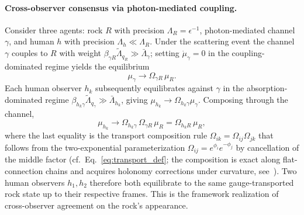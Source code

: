 \documentclass[11pt]{article}
\begin{document}
\paragraph{Cross-observer consensus via photon-mediated coupling.} Consider three agents: rock $R$ with precision $\Lambda_R = \epsilon^{-1}$, photon-mediated channel $\gamma$, and human $h$ with precision $\Lambda_h \ll \Lambda_R$. Under the scattering event the channel $\gamma$ couples to $R$ with weight $\beta_{\gamma R}\tilde{\Lambda}_{q_R} \gg \bar{\Lambda}_\gamma$; setting $\dot{\mu}_\gamma = 0$ in the coupling-dominated regime yields the equilibrium
\begin{equation}
\mu_\gamma \to \Omega_{\gamma R}\,\mu_R.
\end{equation}
Each human observer $h_k$ subsequently equilibrates against $\gamma$ in the absorption-dominated regime $\beta_{h_k\gamma}\tilde{\Lambda}_{q_\gamma} \gg \bar{\Lambda}_{h_k}$, giving $\mu_{h_k} \to \Omega_{h_k\gamma}\mu_\gamma$. Composing through the channel,
\begin{equation}
\mu_{h_k} \to \Omega_{h_k\gamma}\,\Omega_{\gamma R}\,\mu_R = \Omega_{h_k R}\,\mu_R,
\label{eq:rock_consensus}
\end{equation}
where the last equality is the transport composition rule $\Omega_{ik} = \Omega_{ij}\Omega_{jk}$ that follows from the two-exponential parameterization $\Omega_{ij} = e^{\phi_i}e^{-\phi_j}$ by cancellation of the middle factor (cf.\ Eq.~\eqref{eq:transport_def}; the composition is exact along flat-connection chains and acquires holonomy corrections under curvature, see~\cite{Nakahara2003}). Two human observers $h_1, h_2$ therefore both equilibrate to the same gauge-transported rock state up to their respective frames. This is the framework realization of cross-observer agreement on the rock's appearance.
\end{document}
